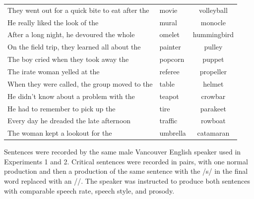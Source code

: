 \begin{table}[!h]
\begin{tabular}{llc}
They went out for a quick bite to eat after the   & movie      & volleyball  \\
He really liked the look of the                   & mural      & monocle     \\
After a long night, he devoured the whole         & omelet     & hummingbird \\
On the field trip, they learned all about the     & painter    & pulley      \\
The boy cried when they took away the             & popcorn    & puppet      \\
The irate woman yelled at the                     & referee    & propeller   \\
When they were called, the group moved to the     & table      & helmet      \\
He didn't know about a problem with the           & teapot     & crowbar     \\
He had to remember to pick up the                 & tire       & parakeet    \\
Every day he dreaded the late afternoon           & traffic    & rowboat     \\
The woman kept a lookout for the                  & umbrella   & catamaran  \\
\bottomrule
\end{tabular}
\end{table}

Sentences were recorded by the same male Vancouver English speaker used in Experiments 1 and 2.  
Critical sentences were recorded in pairs, with one normal production and then a production of the same sentence with the /s/ in the final word replaced with an /\textesh/.  
The speaker was instructed to produce both sentences with comparable speech rate, speech style, and prosody.

